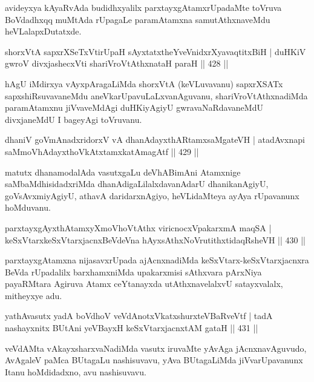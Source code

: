 \begin{artha}
avideyxya kAyaRvAda budidhxyalilx parxtayxgAtamxrUpadaMte toVruva BoVdadhxqq muMtAda rUpagaLe paramAtamxna samutAthxnaveMdu heVLalapxDutatxde.
\end{artha}

\begin{shl}
shorxVtA sapxrXSeTxVtirUpaH sAyxtatxtheYveVnidxrXyavaqtitxBiH |
duHKiV gwroV divxjashecxVti shariVroVtAthxnataH paraH \hfill || 428 ||
\end{shl}

\begin{artha}
hAgU iMdirxya vAyxpAragaLiMda shorxVtA (keVLuvavanu) sapxrXSATx sapxshiRsuvavaneMdu aneVkarUpavuLaLxvanAguvanu, shariVroVtAthxnadiMda paramAtamxnu jiVvaveMdAgi duHKiyAgiyU gwravaNaRdavaneMdU divxjaneMdU I bageyAgi toVruvanu.
\end{artha}

\begin{shl}
dhaniV goVmAnadxridorxV vA dhanAdayxthARtamxsaMgateVH |
atadAvxnapi saMmoVhAdayxthoVkAtxtamxkatAmagAtf \hfill || 429 ||
\end{shl}

\begin{artha}
matutx dhanamodalAda vasutxgaLu deVhABimAni Atamxnige
saMbaMdhisidadxriMda dhanAdigaLilalxdavanAdarU dhanikanAgiyU,
goVsAvxmiyAgiyU, athavA daridarxnAgiyo, heVLidaMteya ayAya rUpavanunx
hoMduvanu.
\end{artha}


\begin{shl}
parxtayxgAyxthAtamxyXmoVhoVtAthx viricnocxVpakarxmA maqSA |
keSxVtarxkeSxVtarxjacnxBeVdeVna hAyxsAthxNoVrutithxtidaqRsheVH \hfill || 430 ||
\end{shl}

\begin{artha}
parxtayxgAtamxna nijasavxrUpada ajAcnxnadiMda keSxVtarx-keSxVtarxjacnxra BeVda rUpadalilx barxhamxniMda upakarxmisi sAthxvara pArxNiya payaRMtara Agiruva Atamx ceYtanayxda utAthxnavelalxvU satayxvalalx, mitheyxye adu.
\end{artha}

\begin{shl}
yathAvasutx yadA boVdhoV veVdAnotxVkatxshurxteVBaRveVtf |
tadA nashayxnitx BUtAni yeVBayxH keSxVtarxjacnxtAM gataH \hfill || 431 ||
\end{shl}

\begin{artha}
veVdAMta vAkayxsharxvaNadiMda vasutx iruvaMte yAvAga jAcnxnavAguvudo, AvAgaleV paMca BUtagaLu nashisuvavu, yAva BUtagaLiMda jiVvarUpavanunx Itanu hoMdidadxno, avu nashisuvavu.
\end{artha}

